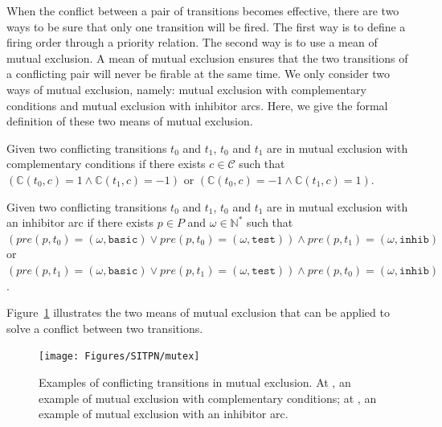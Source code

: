 When the conflict between a pair of transitions becomes effective,
there are two ways to be sure that only one transition will be
fired. The first way is to define a firing order through a priority
relation. The second way is to use a mean of mutual exclusion. A mean
of mutual exclusion ensures that the two transitions of a conflicting
pair will never be firable at the same time. We only consider two ways
of mutual exclusion, namely: mutual exclusion with complementary
conditions and mutual exclusion with inhibitor arcs. Here, we give the
formal definition of these two means of mutual exclusion.


\begin{definition}
  \label{def:mutex-conds}
  Given two conflicting transitions $t_0$ and $t_1$, $t_0$ and $t_1$
  are in mutual exclusion with complementary conditions if there
  exists $c\in\mathcal{C}$ such that
  $(\mathbb{C}(t_0,c)=1\land{}\mathbb{C}(t_1,c)=-1)$ or
  $(\mathbb{C}(t_0,c)=-1\land{}\mathbb{C}(t_1,c)=1)$.
\end{definition}

\begin{definition}
  \label{def:mutex-inhib} Given two conflicting transitions $t_0$ and
  $t_1$, $t_0$ and $t_1$ are in mutual exclusion with an inhibitor arc
  if there exists $p\in{}P$ and $\omega\in{}\mathbb{N}^{*}$ such that
  $(pre(p,t_0)=(\omega,\mathtt{basic})\lor{}pre(p,t_0)=(\omega,\mathtt{test}))\land{}pre(p,t_1)=(\omega,\mathtt{inhib})$
  or
  $(pre(p,t_1)=(\omega,\mathtt{basic})\lor{}pre(p,t_1)=(\omega,\mathtt{test}))\land{}pre(p,t_0)=(\omega,\mathtt{inhib})$.
\end{definition}

Figure~\ref{fig:mutex} illustrates the two means of mutual exclusion
that can be applied to solve a conflict between two transitions.

\begin{figure}[H]
  \centering
  \texttt{[image: Figures/SITPN/mutex]}
  \caption[Examples of conflicting transitions in mutual exclusion.]{
    Examples of conflicting transitions in mutual exclusion. At
    , an example of mutual exclusion with complementary
    conditions; at , an example of mutual exclusion with an
    inhibitor arc.}
  \label{fig:mutex}
\end{figure}


